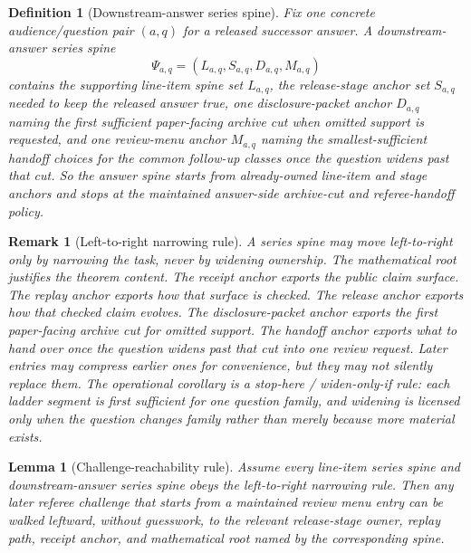 \documentclass[11pt]{article}
\newtheorem{definition}{Definition}
\newtheorem{lemma}{Lemma}
\newtheorem{remark}{Remark}
\begin{document}
\begin{definition}[Downstream-answer series spine]
Fix one concrete audience/question pair $(a,q)$ for a released successor answer.
A \emph{downstream-answer series spine}
\[
\Psi_{a,q}=(L_{a,q},S_{a,q},D_{a,q},M_{a,q})
\]
contains the supporting line-item spine set $L_{a,q}$, the release-stage anchor set $S_{a,q}$ needed to keep the released answer true, one disclosure-packet anchor $D_{a,q}$ naming the first sufficient paper-facing archive cut when omitted support is requested, and one review-menu anchor $M_{a,q}$ naming the smallest-sufficient handoff choices for the common follow-up classes once the question widens past that cut.
So the answer spine starts from already-owned line-item and stage anchors and stops at the maintained answer-side archive-cut and referee-handoff policy.
\end{definition}

\begin{remark}[Left-to-right narrowing rule]
A series spine may move left-to-right only by \emph{narrowing the task}, never by widening ownership.
The mathematical root justifies the theorem content.
The receipt anchor exports the public claim surface.
The replay anchor exports how that surface is checked.
The release anchor exports how that checked claim evolves.
The disclosure-packet anchor exports the first paper-facing archive cut for omitted support.
The handoff anchor exports what to hand over once the question widens past that cut into one review request.
Later entries may compress earlier ones for convenience, but they may not silently replace them.
The operational corollary is a stop-here / widen-only-if rule: each ladder segment is first sufficient for one question family, and widening is licensed only when the question changes family rather than merely because more material exists.
\end{remark}

\begin{lemma}[Challenge-reachability rule]
Assume every line-item series spine and downstream-answer series spine obeys the left-to-right narrowing rule.
Then any later referee challenge that starts from a maintained review menu entry can be walked leftward, without guesswork, to the relevant release-stage owner, replay path, receipt anchor, and mathematical root named by the corresponding spine.
\end{lemma}
\end{document}
